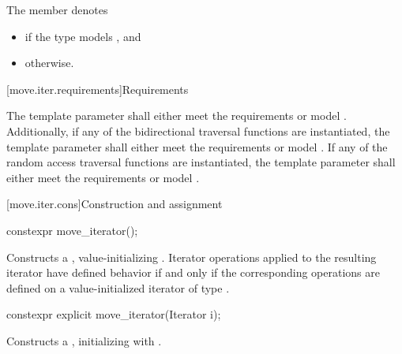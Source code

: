 \pnum
The member   denotes
\begin{itemize}
\item
{} if
the type
 models
, and
\item
{} otherwise.
\end{itemize}

[move.iter.requirements]{Requirements}

\pnum
The template parameter  shall either
meet the  requirements
or model .
Additionally, if any of the bidirectional traversal
functions are instantiated, the template parameter shall either
meet the  requirements
or model .
If any of the random access traversal functions are instantiated, the
template parameter shall either
meet the  requirements
or model
.

[move.iter.cons]{Construction and assignment}

%
\begin{itemdecl}
constexpr move_iterator();
\end{itemdecl}

\begin{itemdescr}
\pnum
\effects Constructs a , value-initializing
. Iterator operations applied to the resulting
iterator have defined behavior if and only if the corresponding operations are defined
on a value-initialized iterator of type .
\end{itemdescr}


%
\begin{itemdecl}
constexpr explicit move_iterator(Iterator i);
\end{itemdecl}

\begin{itemdescr}
\pnum
\effects Constructs a , initializing
 with .
\end{itemdescr}


